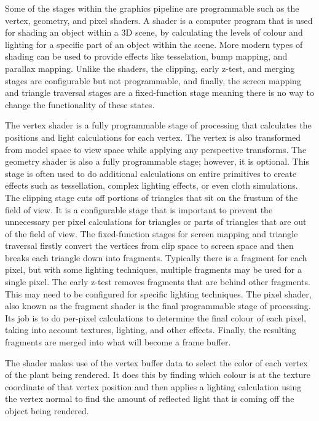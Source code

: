 \noindent
Some of the stages within the graphics pipeline are programmable such as the vertex, geometry, and pixel shaders. A shader is a computer program that is used for shading an object within a 3D scene, by calculating the levels of colour and lighting for a specific part of an object within the scene. More modern types of shading can be used to provide effects like tesselation, bump mapping, and parallax mapping. Unlike the shaders, the clipping, early z-test, and merging stages are configurable but not programmable, and finally, the screen mapping and triangle traversal stages are a fixed-function stage meaning there is no way to change the functionality of these states.

The vertex shader is a fully programmable stage of processing that calculates the positions and light calculations for each vertex. The vertex is also transformed from model space to view space while applying any perspective transforms. The geometry shader is also a fully programmable stage; however, it is optional. This stage is often used to do additional calculations on entire primitives to create effects such as tessellation, complex lighting effects, or even cloth simulations. The clipping stage cuts off portions of triangles that sit on the frustum of the field of view. It is a configurable stage that is important to prevent the unnecessary per pixel calculations for triangles or parts of triangles that are out of the field of view. The fixed-function stages for screen mapping and triangle traversal firstly convert the vertices from clip space to screen space and then breaks each triangle down into fragments. Typically there is a fragment for each pixel, but with some lighting techniques, multiple fragments may be used for a single pixel. The early z-test removes fragments that are behind other fragments. This may need to be configured for specific lighting techniques. The pixel shader, also known as the fragment shader is the final programmable stage of processing. Its job is to do per-pixel calculations to determine the final colour of each pixel, taking into account textures, lighting, and other effects. Finally, the resulting fragments are merged into what will become a frame buffer.

The shader makes use of the vertex buffer data to select the color of each vertex of the plant being rendered. It does this by finding which colour is at the texture coordinate of that vertex position and then applies a lighting calculation using the vertex normal to find the amount of reflected light that is coming off the object being rendered. 


